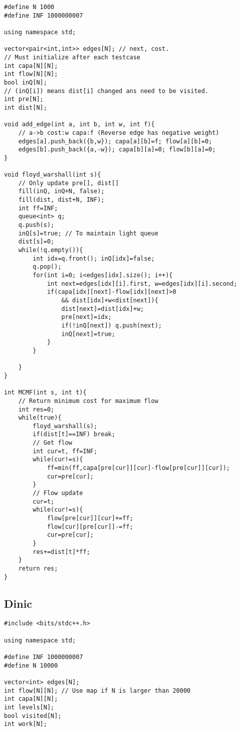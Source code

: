 \documentclass[10pt, landscape]{article}
\begin{document}
\begin{multicols}{2}
\begin{verbatim}
#define N 1000
#define INF 1000000007

using namespace std;

vector<pair<int,int>> edges[N]; // next, cost. 
// Must initialize after each testcase
int capa[N][N];
int flow[N][N];
bool inQ[N]; 
// (inQ[i]) means dist[i] changed ans need to be visited.
int pre[N];
int dist[N];

void add_edge(int a, int b, int w, int f){
    // a->b cost:w capa:f (Reverse edge has negative weight)
    edges[a].push_back({b,w}); capa[a][b]=f; flow[a][b]=0;
    edges[b].push_back({a,-w}); capa[b][a]=0; flow[b][a]=0;
}

void floyd_warshall(int s){
    // Only update pre[], dist[] 
    fill(inQ, inQ+N, false);
    fill(dist, dist+N, INF);
    int ff=INF;
    queue<int> q;
    q.push(s);
    inQ[s]=true; // To maintain light queue
    dist[s]=0;
    while(!q.empty()){
        int idx=q.front(); inQ[idx]=false;
        q.pop();
        for(int i=0; i<edges[idx].size(); i++){
            int next=edges[idx][i].first, w=edges[idx][i].second; 
            if(capa[idx][next]-flow[idx][next]>0 
                && dist[idx]+w<dist[next]){
                dist[next]=dist[idx]+w;
                pre[next]=idx;
                if(!inQ[next]) q.push(next);
                inQ[next]=true;
            }
        }
        
    }
}

int MCMF(int s, int t){
    // Return minimum cost for maximum flow
    int res=0;
    while(true){
        floyd_warshall(s);
        if(dist[t]==INF) break;
        // Get flow
        int cur=t, ff=INF;
        while(cur!=s){
            ff=min(ff,capa[pre[cur]][cur]-flow[pre[cur]][cur]);
            cur=pre[cur];
        }
        // Flow update
        cur=t;
        while(cur!=s){
            flow[pre[cur]][cur]+=ff;
            flow[cur][pre[cur]]-=ff;
            cur=pre[cur];
        }
        res+=dist[t]*ff;
    }
    return res;
}
\end{verbatim}

\subsection{Dinic}
\begin{verbatim}
#include <bits/stdc++.h>

using namespace std;

#define INF 1000000007
#define N 10000

vector<int> edges[N];
int flow[N][N]; // Use map if N is larger than 20000
int capa[N][N];
int levels[N];
bool visited[N];
int work[N];
 

\end{verbatim}
\end{multicols}
\end{document}
